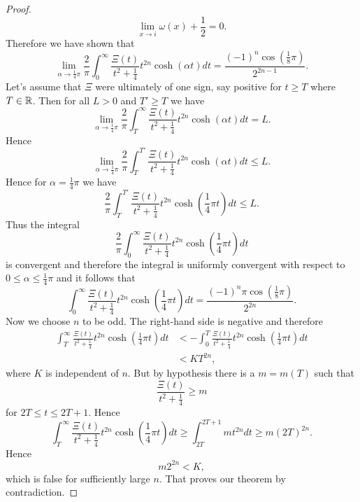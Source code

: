 \begin{proof}
\begin{equation*}
	\lim _{x \to i} \omega(x) + \frac{1}{2} = 0.
\end{equation*}
	Therefore we have shown that
\begin{equation*}
	\lim _{\alpha \to \frac{1}{4} \pi} \frac{2}{\pi} \int _0 ^{\infty} \frac{\Xi(t)}{t^2 + \frac{1}{4}} t^{2n} \cosh(\alpha t) dt = \frac{(-1)^{n} \cos(\frac{1}{8} \pi)}{2^{2n - 1}}.
\end{equation*}
	Let's assume that $\Xi$ were ultimately of one sign, say positive for $t \geq T$ where $T \in \mathbb{R}$. Then for all $L > 0$ and $T' \geq T$ we have
\begin{equation*}
	\lim _{\alpha \to \frac{1}{4} \pi} \frac{2}{\pi} \int _T ^{\infty} \frac{\Xi(t)}{t^2 + \frac{1}{4}} t^{2n} \cosh(\alpha t) dt = L.
\end{equation*}
	Hence
\begin{equation*}
	\lim _{\alpha \to \frac{1}{4} \pi} \frac{2}{\pi} \int _T ^{T'} \frac{\Xi(t)}{t^2 + \frac{1}{4}} t^{2n} \cosh(\alpha t) dt \leq L.
\end{equation*}
	Hence for $\alpha = \frac{1}{4}\pi$ we have
\begin{equation*}
	\frac{2}{\pi} \int _T ^{T'} \frac{\Xi(t)}{t^2 + \frac{1}{4}} t^{2n} \cosh(\frac{1}{4}\pi t) dt \leq L.
\end{equation*}
	Thus the integral
\begin{equation*}
	\frac{2}{\pi} \int _0 ^{\infty} \frac{\Xi(t)}{t^2 + \frac{1}{4}} t^{2n} \cosh(\frac{1}{4}\pi t) dt
\end{equation*}
	is convergent and therefore the integral is uniformly convergent with respect to $0 \leq \alpha \leq \frac{1}{4}\pi$ and it follows that
\begin{equation*}
	\int _0 ^{\infty} \frac{\Xi(t)}{t^2 + \frac{1}{4}} t^{2n} \cosh(\frac{1}{4} \pi t) dt = \frac{(-1)^{n} \pi \cos(\frac{1}{8} \pi)}{2^{2n}}.
\end{equation*}
	Now we choose $n$ to be odd. The right-hand side is negative and therefore
\begin{equation*}
\begin{aligned}
	\int _T ^{\infty} \frac{\Xi(t)}{t^2 + \frac{1}{4}} t^{2n} \cosh(\frac{1}{4} \pi t) dt 
		&< - \int _0 ^{T} \frac{\Xi(t)}{t^2 + \frac{1}{4}} t^{2n} \cosh(\frac{1}{4} \pi t) dt \\
		&< KT^{2n},
\end{aligned}
\end{equation*}
	where $K$ is independent of $n$. But by hypothesis there is a $m = m(T)$ such that
\begin{equation*}
	\frac{\Xi(t)}{t^2 + \frac{1}{4}} \geq m
\end{equation*}
	for $2T \leq t \leq 2T + 1$. Hence
\begin{equation*}
	\int _T ^{\infty} \frac{\Xi(t)}{t^2 + \frac{1}{4}} t^{2n} \cosh(\frac{1}{4} \pi t) dt \geq \int _{2T} ^{2T + 1} mt^{2n} dt \geq m(2T)^{2n}.
\end{equation*}
	Hence
\begin{equation*}
	m2^{2n} < K,
\end{equation*}
	which is false for sufficiently large $n$. That proves our theorem by contradiction.
\end{proof}
